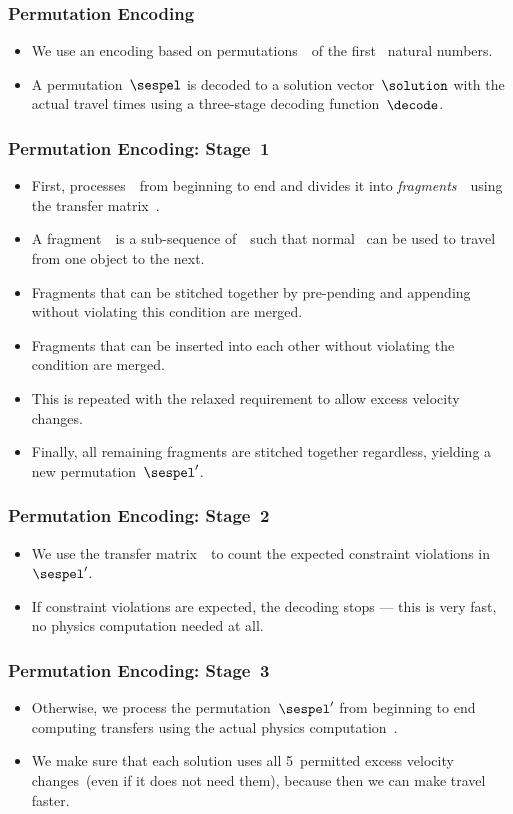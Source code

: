 \documentclass[aspectratio=169,mathserif,notheorems]{beamer}%
\begin{document}
%
\begin{frame}%
\frametitle{Permutation Encoding}%
%
\begin{itemize}%
%
\item We use an encoding based on permutations~\sespel\ of the first \scale~natural numbers.%
%
\item<2-> A permutation~$\sespel$ is decoded to a solution vector~$\solution$ with the actual travel times using a three-stage decoding function~$\decode$.%
%
\end{itemize}%
\end{frame}%
%
\begin{frame}%
\frametitle{Permutation Encoding: Stage~1}%
\begin{itemize}%
%
\item First, \decodeb{\sespel} processes~\sespel\ from beginning to end and divides it into \emph{fragments}~\fragment\ using the transfer matrix~\transferMatrix.%
%
\item<2-> A fragment~\fragment\ is a sub-sequence of~\sespel\ such that normal \dV\ can be used to travel from one object to the next.%
%
\item<3-> Fragments that can be stitched together by pre-pending and appending without violating this condition are merged.%
%
\item<4-> Fragments that can be inserted into each other without violating the condition are merged.%
%
\item<5-> This is repeated with the relaxed requirement to allow excess velocity changes.%
%
\item<6-> Finally, all remaining fragments are stitched together regardless, yielding a new permutation~$\sespel'$.%
%
\end{itemize}%
\end{frame}%
%
\begin{frame}%
\frametitle{Permutation Encoding: Stage~2}%
\begin{itemize}%
%
\item We use the transfer matrix~\transferMatrix\ to count the expected constraint violations in~$\sespel'$.%
%
\item<2-> If constraint violations are expected, the decoding stops --- this is very fast, no physics computation needed at all.%
%
\end{itemize}%
\end{frame}%
%
%
\begin{frame}%
\frametitle{Permutation Encoding: Stage~3}%
\begin{itemize}%
\item Otherwise, we process the permutation~$\sespel'$ from beginning to end computing transfers using the actual physics computation~\optDv.%
%
\item<2-> We make sure that each solution uses all 5~permitted excess velocity changes~(even if it does not need them), because then we can make travel faster.%
\end{itemize}%
\end{frame}%
\end{document}
